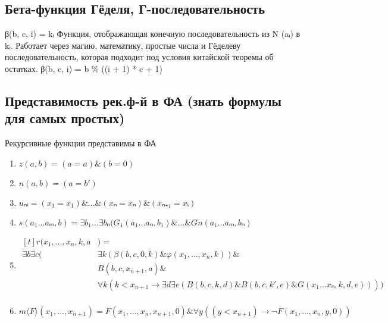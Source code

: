 \documentclass[12pt]{article}
\renewcommand{\phi}{\varphi}
\newcommand{\ltemplate}{\langle}
\newcommand{\rtemplate}{\rangle}
\begin{document}
\subsection{Бета-функция Гёделя, Г-последовательность}
\label{sec-2-27}
β(b, c, i) = kᵢ
Функция, отображающая конечную последовательность из N (aᵢ) в kᵢ.
Работает через магию, математику, простые числа и Гёделеву
последовательность, которая подходит под условия китайской
теоремы об остатках.
β(b, c, i) = b \% ((i + 1) * c + 1)
\subsection{Представимость рек.ф-й в ФА (знать формулы для самых простых)}
\label{sec-2-28}
Рекурсивные функции представимы в ФА
\begin{enumerate}
\item $z(a, b) = (a = a) \& (b = 0)$
\item $n(a, b) = (a = b')$
\item $uₙᵢ = (x_1 = x_1) \& \ldots{} \& (xₙ = xₙ) \& (xₙ₊_1 = xᵢ)$
\item $s(a_1\ldots{}aₘ, b) = \exists b_1\ldots{}\exists bₙ(G_1(a_1\ldots{}aₙ, b_1) \& \ldots{} \& Gn(a_1\ldots{}aₘ, bₙ)$
\item $\begin{aligned}[t]
        r(x_1,\dotsc,x_n, k, a&) =\\
    \exists b\exists c(&\exists k(\beta(b, c, 0, k) \& \phi(x_1, \dotsc, x_n, k)) \&\\
        &B(b, c, x_{n+1}, a)\&\\
        &\forall k(k<x_{n+1} \to \exists d\exists e(B(b,c,k,d)\&B(b,c,k',e)\&G(x_1\ldots{}xₙ,k,d,e))))\\
    \end{aligned}$
\item $m\ltemplate F\rtemplate(x_1,\dotsc, x_{n+1}) = F(x_1, \dotsc, x_n, x_{n+1}, 0) \& \forall y((y < x_{n+1}) \to \lnot F(x_1,\dotsc, x_n, y, 0))$
\end{enumerate}
\end{document}
